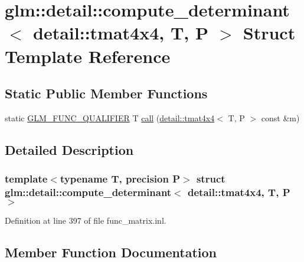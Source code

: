 \hypertarget{structglm_1_1detail_1_1compute__determinant_3_01detail_1_1tmat4x4_00_01_t_00_01_p_01_4}{}\section{glm\+:\+:detail\+:\+:compute\+\_\+determinant$<$ detail\+:\+:tmat4x4, T, P $>$ Struct Template Reference}
\label{structglm_1_1detail_1_1compute__determinant_3_01detail_1_1tmat4x4_00_01_t_00_01_p_01_4}
\subsection*{Static Public Member Functions}
\begin{DoxyCompactItemize}
\item 
static \hyperlink{setup_8hpp_a33fdea6f91c5f834105f7415e2a64407}{G\+L\+M\+\_\+\+F\+U\+N\+C\+\_\+\+Q\+U\+A\+L\+I\+F\+I\+ER} T \hyperlink{structglm_1_1detail_1_1compute__determinant_3_01detail_1_1tmat4x4_00_01_t_00_01_p_01_4_aa7fa7eae68f9b10c3ac3a80bca669c98}{call} (\hyperlink{structglm_1_1detail_1_1tmat4x4}{detail\+::tmat4x4}$<$ T, P $>$ const \&m)
\end{DoxyCompactItemize}


\subsection{Detailed Description}
\subsubsection*{template$<$typename T, precision P$>$\newline
struct glm\+::detail\+::compute\+\_\+determinant$<$ detail\+::tmat4x4, T, P $>$}



Definition at line 397 of file func\+\_\+matrix.\+inl.



\subsection{Member Function Documentation}
\mbox{\label{structglm_1_1detail_1_1compute__determinant_3_01detail_1_1tmat4x4_00_01_t_00_01_p_01_4_aa7fa7eae68f9b10c3ac3a80bca669c98}} 
